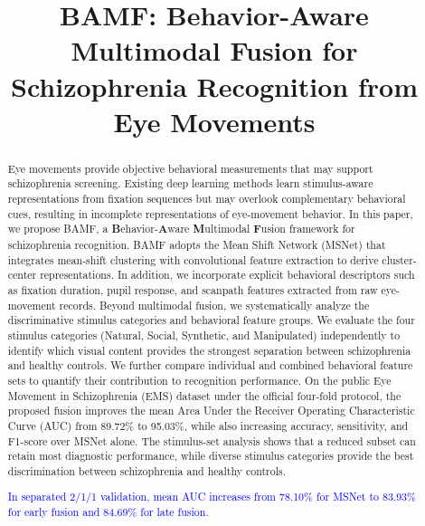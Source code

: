 \documentclass[conference,a4paper]{IEEEtran}
\begin{document}
\title{BAMF: Behavior-Aware Multimodal Fusion for Schizophrenia Recognition from Eye Movements}

\author{
}

\maketitle

\begin{abstract}
Eye movements provide objective behavioral measurements that may support schizophrenia screening. Existing deep learning methods learn stimulus-aware representations from fixation sequences but may overlook complementary behavioral cues, resulting in incomplete representations of eye-movement behavior. In this paper, we propose BAMF, a \textbf{B}ehavior-\textbf{A}ware \textbf{M}ultimodal \textbf{F}usion framework for schizophrenia recognition. BAMF adopts the Mean Shift Network (MSNet) that integrates mean-shift clustering with convolutional feature extraction to derive cluster-center representations. In addition, we incorporate explicit behavioral descriptors such as fixation duration, pupil response, and scanpath features extracted from raw eye-movement records. Beyond multimodal fusion, we systematically analyze the discriminative stimulus categories and behavioral feature groups. We evaluate the four stimulus categories (Natural, Social, Synthetic, and Manipulated) independently to identify which visual content provides the strongest separation between schizophrenia and healthy controls. We further compare individual and combined behavioral feature sets to quantify their contribution to recognition performance. On the public Eye Movement in Schizophrenia (EMS) dataset under the official four-fold protocol, the proposed fusion improves the mean Area Under the Receiver Operating Characteristic Curve (AUC) from 89.72\% to 95.03\%, while also increasing accuracy, sensitivity, and F1-score over MSNet alone. The stimulus-set analysis shows that a reduced subset can retain most diagnostic performance, while diverse stimulus categories provide the best discrimination between schizophrenia and healthy controls.

\textcolor{blue}{In separated 2/1/1 validation, mean AUC increases from 78.10\% for MSNet to 83.93\% for early fusion and 84.69\% for late fusion.}
\end{abstract}
\end{document}
